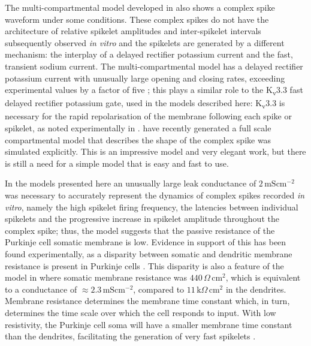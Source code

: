 \documentclass[utf8]{frontiersSCNS} %
\newcommand{\msi}{\,\mathrm{mS cm^{-2}}}
\begin{document}
The multi-compartmental model developed in
\cite{DeSchutterBower1994a,DeSchutterBower1994b,DeSchutterBower1994c}
also shows a complex spike waveform under some conditions. These
complex spikes do not have the architecture of relative spikelet
amplitudes and inter-spikelet intervals subsequently observed
\textit{in vitro} and the spikelets are generated by a different
mechanism: the interplay of a delayed rectifier potassium current and
the fast, transient sodium current. The multi-compartmental model has
a delayed rectifier potassium current with unusually large opening and
closing rates, exceeding experimental values by a factor of five
\cite{YamadaEtAl1989}; this plays a similar role to the
K\textsubscript{v}3.3 fast delayed rectifier potassium gate,
\cite{VeysEtAl2013,ZaghaEtAl2008} used in the models described here:
K\textsubscript{v}3.3 is necessary for the rapid repolarisation of the
membrane following each spike or spikelet, as noted experimentally in
\cite{ZaghaEtAl2008,VeysEtAl2013}. \cite{ZangEtAl2018} have recently
generated a full scale compartmental model that describes the shape of
the complex spike was simulated explicitly. This is an impressive
model and very elegant work, but there is still a need for a simple
model that is easy and fast to use.

In the models presented here an unusually large leak conductance of
$2\msi$ was necessary to accurately represent the dynamics of complex
spikes recorded \textit{in vitro}, namely the high spikelet firing
frequency, the latencies between individual spikelets and the
progressive increase in spikelet amplitude throughout the complex
spike; thus, the model suggests that the passive resistance of the
Purkinje cell somatic membrane is low. Evidence in support of this has
been found experimentally, as a disparity between somatic and
dendritic membrane resistance is present in Purkinje cells
\cite{RappEtAl1994}. This disparity is also a feature of the model in
\cite{DeSchutterBower1994a,DeSchutterBower1994b,DeSchutterBower1994c}
where somatic membrane resistance was $440\,\Omega\,\mathrm{cm}^2$,
which is equivalent to a conductance of $\approx 2.3\msi$, compared to
$11\,\mathrm{k}\Omega\,\mathrm{cm}^2$ in the dendrites. Membrane
resistance determines the membrane time constant which, in turn,
determines the time scale over which the cell responds to input. With
low resistivity, the Purkinje cell soma will have a smaller membrane
time constant than the dendrites, facilitating the generation of very
fast spikelets \cite{WarnaarEtAl2015}.
\end{document}
